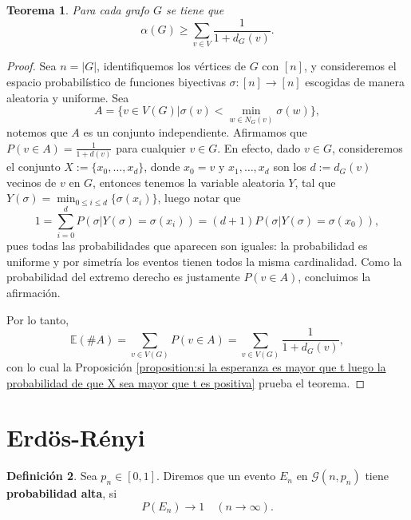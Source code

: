 \documentclass[12pt]{report}
\theoremstyle{plain}
\newtheorem{theorem}{Teorema}[section]
\theoremstyle{definition}
\newtheorem{definition}[theorem]{Definición}
\newcommand{\abs}[1]{\left \vert #1 \right \vert}
\begin{document}
\begin{theorem}
Para cada grafo $G$ se tiene que
\[
    \alpha (G) \geq \sum_{v \in V} \frac{1}{1 + d_G (v)}.
\]
\end{theorem}
\begin{proof}
Sea $n = \abs{G}$, identifiquemos los vértices de $G$ con $[n]$, y consideremos el espacio probabilístico de funciones biyectivas $\sigma : [n] \to [n]$ escogidas de manera aleatoria y uniforme. Sea
\[
    A = \{v \in V(G) | \sigma (v) < \min_{w \in N_G (v)} \sigma (w)\},
\]
notemos que $A$ es un conjunto independiente. Afirmamos que $P (v \in A) = \frac{1}{1 + d(v)}$ para cualquier $v \in G$. En efecto, dado $v \in G$, consideremos el conjunto $X := \{x_0, \ldots, x_d\}$, donde $x_0 = v$ y $x_1, \ldots, x_d$ son los $d := d_G(v)$ vecinos de $v$ en $G$, entonces tenemos la variable aleatoria $Y$, tal que $Y ( \sigma) = \min_{0 \leq i \leq d} \{\sigma (x_i)\}$, luego notar que
\[
    1 = \sum_{i = 0}^d P ( \sigma | Y(\sigma) = \sigma (x_i) ) = (d+1) P (\sigma | Y (\sigma) = \sigma (x_0)),
\]
pues todas las probabilidades que aparecen son iguales: la probabilidad es uniforme y por simetría los eventos tienen todos la misma cardinalidad. Como la probabilidad del extremo derecho es justamente $P (v \in A)$, concluimos la afirmación.

Por lo tanto,
\[
    \mathbb{E}(\#A) = \sum_{v \in V(G)} P ( v \in A) = \sum_{v \in V(G)} \frac{1 }{1 + d_G(v)},
\]
con lo cual la Proposición \ref{proposition:si la esperanza es mayor que t luego la probabilidad de que X sea mayor que t es positiva} prueba el teorema.
\end{proof}


\section{Erdös-Rényi}

\begin{definition}
Sea $p_n \in [0,1]$. Diremos que un evento $E_n$ en $\mathcal G (n,p_n)$ tiene \textbf{probabilidad alta}, si
\[
    P(E_n) \longrightarrow 1 \quad (n \to \infty).
\]
\end{definition}
\end{document}
